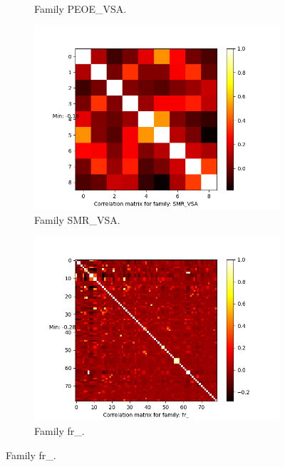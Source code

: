 \documentclass[11pt]{article}
\begin{document}
\begin{figure}
\begin{subfigure}[b]{0.45\textwidth}
        \caption{Family PEOE\_VSA.}
        \label{fig:correlationPEOEVSA}
     \end{subfigure}
          \hfill
     \begin{subfigure}[b]{0.45\textwidth}
         \centering
        \includegraphics[scale=0.5]{images/correlationSMRVSA}
        \caption{Family SMR\_VSA.}
        \label{fig:correlationSMRVSA}
     \end{subfigure}
               \hfill
     \begin{subfigure}[b]{0.45\textwidth}
         \centering
        \includegraphics[scale=0.5]{images/correlationfr}
        \caption{Family fr\_.}
        \label{fig:correlationfr}
     \end{subfigure}

\end{figure}
\end{document}
